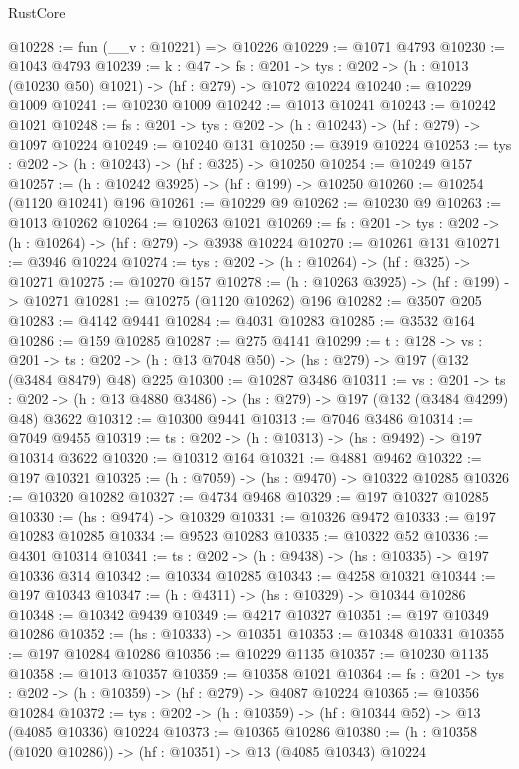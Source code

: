 \begin{lexlean}{RustCore}
\begin{coremodule}
@10228 := fun (__v : @10221) => @10226
@10229 := @1071 @4793
@10230 := @1043 @4793
@10239 := {k : @47} ->
  {fs : @201} -> {tys : @202} -> (h : @1013 (@10230 @50) @1021) -> (hf : @279) -> @1072 @10224
@10240 := @10229 @1009
@10241 := @10230 @1009
@10242 := @1013 @10241
@10243 := @10242 @1021
@10248 := {fs : @201} -> {tys : @202} -> (h : @10243) -> (hf : @279) -> @1097 @10224
@10249 := @10240 @131
@10250 := @3919 @10224
@10253 := {tys : @202} -> (h : @10243) -> (hf : @325) -> @10250
@10254 := @10249 @157
@10257 := (h : @10242 @3925) -> (hf : @199) -> @10250
@10260 := @10254 (@1120 @10241) @196
@10261 := @10229 @9
@10262 := @10230 @9
@10263 := @1013 @10262
@10264 := @10263 @1021
@10269 := {fs : @201} -> {tys : @202} -> (h : @10264) -> (hf : @279) -> @3938 @10224
@10270 := @10261 @131
@10271 := @3946 @10224
@10274 := {tys : @202} -> (h : @10264) -> (hf : @325) -> @10271
@10275 := @10270 @157
@10278 := (h : @10263 @3925) -> (hf : @199) -> @10271
@10281 := @10275 (@1120 @10262) @196
@10282 := @3507 @205
@10283 := @4142 @9441
@10284 := @4031 @10283
@10285 := @3532 @164
@10286 := @159 @10285
@10287 := @275 @4141
@10299 := {t : @128} ->
  {vs : @201} ->
  {ts : @202} -> (h : @13 @7048 @50) -> (hs : @279) -> @197 (@132 (@3484 @8479) @48) @225
@10300 := @10287 @3486
@10311 := {vs : @201} ->
  {ts : @202} -> (h : @13 @4880 @3486) -> (hs : @279) -> @197 (@132 (@3484 @4299) @48) @3622
@10312 := @10300 @9441
@10313 := @7046 @3486
@10314 := @7049 @9455
@10319 := {ts : @202} -> (h : @10313) -> (hs : @9492) -> @197 @10314 @3622
@10320 := @10312 @164
@10321 := @4881 @9462
@10322 := @197 @10321
@10325 := (h : @7059) -> (hs : @9470) -> @10322 @10285
@10326 := @10320 @10282
@10327 := @4734 @9468
@10329 := @197 @10327 @10285
@10330 := (hs : @9474) -> @10329
@10331 := @10326 @9472
@10333 := @197 @10283 @10285
@10334 := @9523 @10283
@10335 := @10322 @52
@10336 := @4301 @10314
@10341 := {ts : @202} -> (h : @9438) -> (hs : @10335) -> @197 @10336 @314
@10342 := @10334 @10285
@10343 := @4258 @10321
@10344 := @197 @10343
@10347 := (h : @4311) -> (hs : @10329) -> @10344 @10286
@10348 := @10342 @9439
@10349 := @4217 @10327
@10351 := @197 @10349 @10286
@10352 := (hs : @10333) -> @10351
@10353 := @10348 @10331
@10355 := @197 @10284 @10286
@10356 := @10229 @1135
@10357 := @10230 @1135
@10358 := @1013 @10357
@10359 := @10358 @1021
@10364 := {fs : @201} -> {tys : @202} -> (h : @10359) -> (hf : @279) -> @4087 @10224
@10365 := @10356 @10284
@10372 := {tys : @202} -> (h : @10359) -> (hf : @10344 @52) -> @13 (@4085 @10336) @10224
@10373 := @10365 @10286
@10380 := (h : @10358 (@1020 @10286)) -> (hf : @10351) -> @13 (@4085 @10343) @10224

\end{coremodule}
\end{lexlean}
